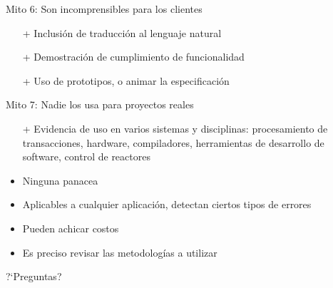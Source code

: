 \documentclass{beamer}
\begin{document}
\begin{frame}{Mito 6: Son incomprensibles para los clientes}
\begin{itemize}[<+->]
\item[+] Inclusi\'on de traducci\'on al lenguaje natural
\item[+] Demostraci\'on de cumplimiento de funcionalidad
\item[+] Uso de prototipos, o animar la especificaci\'on
\end{itemize}
\end{frame}
 
\begin{frame}{Mito 7: Nadie los usa para proyectos reales}
\begin{itemize}[<+->]
\item[+] Evidencia de uso en varios sistemas y disciplinas: procesamiento de transacciones, hardware, compiladores, herramientas de desarrollo de software, control de reactores
\end{itemize}
\end{frame}

\begin{frame}

    \begin{itemize}
        \item Ninguna panacea
        \item Aplicables a cualquier aplicaci\'on, detectan ciertos tipos de errores
        \item Pueden achicar costos
        \item Es preciso revisar las metodolog\'ias a utilizar
    \end{itemize}
    
\end{frame}

\begin{frame}
    \begin{center}
        
    \LARGE{?`Preguntas?}
    \end{center}
\end{frame}
\end{document}

